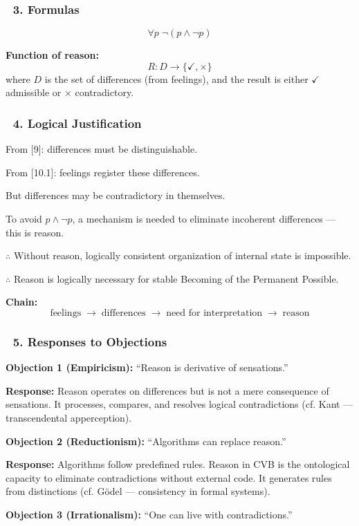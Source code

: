 \documentclass[12pt]{article}
\begin{document}
\subsubsection*{🔹 3. Formulas}
\[
\forall p\; \neg(p \wedge \neg p)
\]

\textbf{Function of reason:}
\[
R: D \rightarrow \{\checkmark, \times\}
\]
where $D$ is the set of differences (from feelings), and the result is either $\checkmark$ admissible or $\times$ contradictory.

\subsubsection*{🔹 4. Logical Justification}
From [9]: differences must be distinguishable.

From [10.1]: feelings register these differences.

But differences may be contradictory in themselves.

To avoid $p \wedge \neg p$, a mechanism is needed to eliminate incoherent differences — this is reason.

$\therefore$ Without reason, logically consistent organization of internal state is impossible.

$\therefore$ Reason is logically necessary for stable Becoming of the Permanent Possible.

\textbf{Chain:}
\[
\text{feelings} \;\rightarrow\; \text{differences} \;\rightarrow\; \text{need for interpretation} \;\rightarrow\; \text{reason}
\]

\subsubsection*{🔹 5. Responses to Objections}
\textbf{Objection 1 (Empiricism):}
``Reason is derivative of sensations.''

\textbf{Response:}
Reason operates on differences but is not a mere consequence of sensations. It processes, compares, and resolves logical contradictions (cf. Kant — transcendental apperception).

\bigskip
\textbf{Objection 2 (Reductionism):}
``Algorithms can replace reason.''

\textbf{Response:}
Algorithms follow predefined rules. Reason in CVB is the ontological capacity to eliminate contradictions without external code. It generates rules from distinctions (cf. Gödel — consistency in formal systems).

\bigskip
\textbf{Objection 3 (Irrationalism):}
``One can live with contradictions.''
\end{document}
